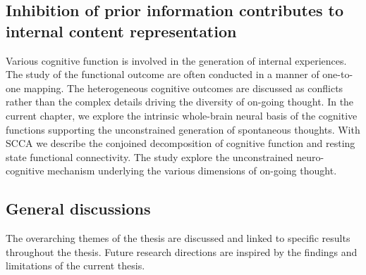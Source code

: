 \subsection*{Inhibition of prior information contributes to internal content representation}
Various cognitive function is involved in the generation of internal experiences. The study of the functional outcome are often conducted in a manner of one-to-one mapping. The heterogeneous cognitive outcomes are discussed as conflicts rather than the complex details driving the diversity of on-going thought. In the current chapter, we explore the intrinsic whole-brain neural basis of the cognitive functions supporting the unconstrained generation of spontaneous thoughts.  With SCCA we describe the conjoined decomposition of cognitive function and resting state functional connectivity. The study explore the unconstrained neuro-cognitive mechanism underlying the various dimensions of on-going thought.

\subsection*{General discussions}
The overarching themes of the thesis are discussed and linked to specific results throughout the thesis. Future research directions are inspired by the findings and limitations of the current thesis.

